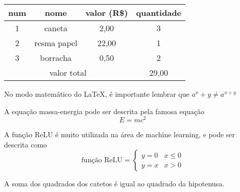 \begin{tabular}{| c || c c | c | }
\hline
num & nome & valor (R\$) & quantidade \\
\hline \hline
1 & caneta & 2,00 & 3 \\
2 & resma papel & 22,00 & 1 \\
3 & borracha & 0,50 & 2 \\
\hline
\multicolumn{3}{|c|}{valor total} & 29,00 \\ 
\hline
\end{tabular}
\newpage

No modo matemático do \LaTeX{}, é importante lembrar que
$ a^x+y \ne a^{x+y} $

A equação massa-energia pode ser descrita pela famosa equação
\begin{equation}
    E=mc^2
\end{equation}

A função ReLU é muito utilizada na área de machine learning, e pode ser descrita como
$$
\text{função ReLU} = 
\left\{
    \begin{array}{ll}
        y = 0 & x \leq 0 \\
        y = x & x > 0
    \end{array}
\right.
$$

\begin{teo}
A soma dos quadrados dos catetos é igual ao quadrado da hipotenusa.
\end{teo}